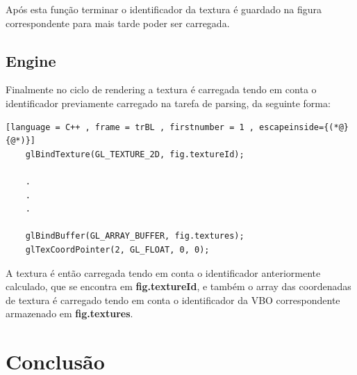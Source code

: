 \documentclass[a4paper]{article}
\begin{document}
Após esta função terminar o identificador da textura é guardado na figura correspondente para mais tarde poder ser carregada.

\newpage
\subsection{Engine}
\label{sec:enginet}

Finalmente no ciclo de rendering a textura é carregada tendo em conta o identificador previamente carregado na tarefa de parsing, da seguinte forma:

\begin{lstlisting}[language = C++ , frame = trBL , firstnumber = 1 , escapeinside={(*@}{@*)}]
	glBindTexture(GL_TEXTURE_2D, fig.textureId);

	.
	.
	.

	glBindBuffer(GL_ARRAY_BUFFER, fig.textures);
	glTexCoordPointer(2, GL_FLOAT, 0, 0);
\end{lstlisting}

A textura é então carregada tendo em conta o identificador anteriormente calculado, que se encontra em \textbf{fig.textureId}, e também o array das coordenadas de textura é carregado tendo em conta o identificador da VBO correspondente armazenado em \textbf{fig.textures}.

\newpage

\section{Conclusão}
\label{sec:conclusao}
\end{document}
